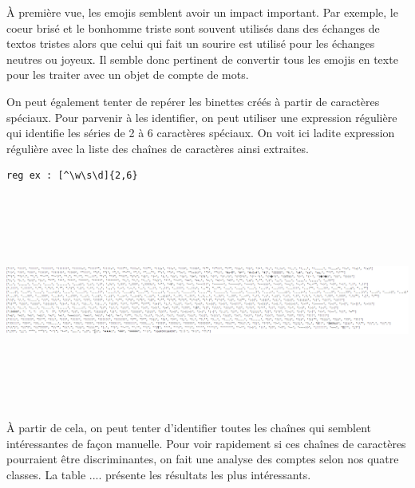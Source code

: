 
À première vue, les emojis semblent avoir un impact important. Par exemple, le coeur brisé et le bonhomme triste sont souvent utilisés dans des échanges de textos tristes alors que celui qui fait un sourire est utilisé pour les échanges neutres ou joyeux. Il semble donc pertinent de convertir tous les emojis en texte pour les traiter avec un objet de compte de mots.

On peut également tenter de repérer les binettes créés à partir de caractères spéciaux. Pour parvenir à les identifier, on peut utiliser une expression régulière qui identifie les séries de 2 à 6 caractères spéciaux. On voit ici ladite expression régulière avec la liste des chaînes de caractères ainsi extraites.
\begin{verbatim}
reg ex : [^\w\s\d]{2,6}
\end{verbatim}

\includegraphics[width=\linewidth,height=7cm]{images/analyse_list_car_speciaux}

À partir de cela, on peut tenter d'identifier toutes les chaînes qui semblent intéressantes de façon manuelle. Pour voir rapidement si ces chaînes de caractères pourraient être discriminantes, on fait une analyse des comptes selon nos quatre classes. La table .... présente les résultats les plus intéressants.

